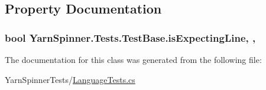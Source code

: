 \subsection{Property Documentation}
\hypertarget{a00144_a47f35b8e8123ed9471883d02b8bc9f3e}{
\subsubsection[{is\-Expecting\-Line}]{\setlength{\rightskip}{0pt plus 5cm}bool Yarn\-Spinner.\-Tests.\-Test\-Base.\-is\-Expecting\-Line\hspace{0.3cm}{\ttfamily [get]}, {\ttfamily [protected]}, {\ttfamily [inherited]}}}\label{a00144_a47f35b8e8123ed9471883d02b8bc9f3e}


The documentation for this class was generated from the following file\-:\begin{DoxyCompactItemize}
\item 
Yarn\-Spinner\-Tests/\hyperlink{a00276}{Language\-Tests.\-cs}\end{DoxyCompactItemize}
